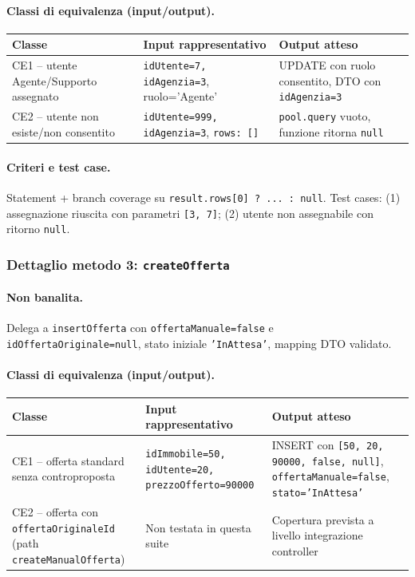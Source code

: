 \documentclass[a4paper,11pt]{article}
\begin{document}
\paragraph{Classi di equivalenza (input/output).}
\begin{table}[H]
\centering
\small
\begin{tabular}{@{}p{}p{}p{}@{}}
\toprule
Classe & Input rappresentativo & Output atteso \\
\midrule
CE1 -- utente Agente/Supporto assegnato & \texttt{idUtente=7, idAgenzia=3}, ruolo='Agente' & UPDATE con ruolo consentito, DTO con \texttt{idAgenzia=3} \\
CE2 -- utente non esiste/non consentito & \texttt{idUtente=999, idAgenzia=3}, \texttt{rows: []} & \texttt{pool.query} vuoto, funzione ritorna \texttt{null} \\
\bottomrule
\end{tabular}
\end{table}

\paragraph{Criteri e test case.}
Statement + branch coverage su \texttt{result.rows[0] ? ... : null}. Test cases: (1) assegnazione riuscita con parametri \texttt{[3, 7]}; (2) utente non assegnabile con ritorno \texttt{null}.

\subsubsection{Dettaglio metodo 3: \texttt{createOfferta}}
\paragraph{Non banalita.}
Delega a \texttt{insertOfferta} con \texttt{offertaManuale=false} e \texttt{idOffertaOriginale=null}, stato iniziale \texttt{'InAttesa'}, mapping DTO validato.

\paragraph{Classi di equivalenza (input/output).}
\begin{table}[H]
\centering
\small
\begin{tabular}{@{}p{}p{}p{}@{}}
\toprule
Classe & Input rappresentativo & Output atteso \\
\midrule
CE1 -- offerta standard senza controproposta & \texttt{idImmobile=50, idUtente=20, prezzoOfferto=90000} & INSERT con \texttt{[50, 20, 90000, false, null]}, \texttt{offertaManuale=false}, \texttt{stato='InAttesa'} \\
CE2 -- offerta con \texttt{offertaOriginaleId} (path \texttt{createManualOfferta}) & Non testata in questa suite & Copertura prevista a livello integrazione controller \\
\bottomrule
\end{tabular}
\end{table}
\end{document}
